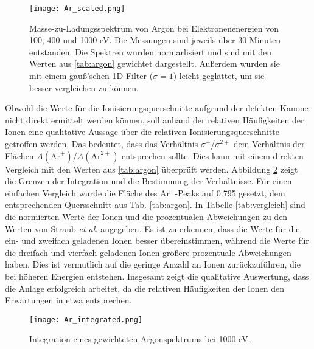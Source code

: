 \begin{landscape}
    \begin{figure}
        \centering
        \hspace*{-3cm}\texttt{[image: Ar\_scaled.png]}
        \caption[Skaliertes Massenspektrum von Argon bei verschiedenen Elektronenenergien]{Masse-zu-Ladungsspektrum von Argon bei Elektronenenergien von 100, 400 und 1000 eV. Die Messungen sind jeweils über 30 Minuten entstanden. Die Spektren wurden normarlisiert und sind mit den Werten aus \ref{tab:argon} gewichtet dargestellt. Außerdem wurden sie mit einem gauß'schen 1D-Filter ($\sigma = 1$) leicht geglättet, um sie besser vergleichen zu können.}
        \label{fig:ar_scaled}
    \end{figure}
\end{landscape}

Obwohl die Werte für die Ionisierungsquerschnitte aufgrund der defekten Kanone nicht direkt ermittelt werden können, soll anhand der relativen Häufigkeiten der Ionen eine qualitative Aussage über die relativen Ionisierungsquerschnitte getroffen werden. Das bedeutet, dass das Verhältnis $\sigma^+$/$\sigma^{2+}$ dem Verhältnis der Flächen $A(\text{Ar}^+)$/$A(\text{Ar}^{2+})$ entsprechen sollte. Dies kann mit einem direkten Vergleich  mit den Werten aus \ref{tab:argon} überprüft werden. Abbildung \ref{fig:ar_ratio} zeigt die Grenzen der Integration und die Bestimmung der Verhältnisse. Für einen einfachen Vergleich wurde die Fläche des Ar$^+$-Peaks auf 0.795 gesetzt, dem entsprechenden Quersschnitt aus Tab. \ref{tab:argon}. In Tabelle \ref{tab:vergleich} sind die normierten Werte der Ionen und die prozentualen Abweichungen zu den Werten von Straub \textit{et al.} \cite{Straub} angegeben. Es ist zu erkennen, dass die Werte für die ein- und zweifach geladenen Ionen besser übereinstimmen, während die Werte für die dreifach und vierfach geladenen Ionen größere prozentuale Abweichungen haben. Dies ist vermutlich auf die geringe Anzahl an Ionen zurückzuführen, die bei höheren Energien entstehen. Insgesamt zeigt die qualitative Auswertung, dass die Anlage erfolgreich arbeitet, da die relativen Häufigkeiten der Ionen den Erwartungen in etwa entsprechen. 

\begin{figure}
    \centering
    \texttt{[image: Ar\_integrated.png]}
    \caption[Integration eines gewichteten Argonspektrums bei 1000 eV]{Integration eines gewichteten Argonspektrums bei 1000 eV.}
    \label{fig:ar_ratio}
\end{figure}

